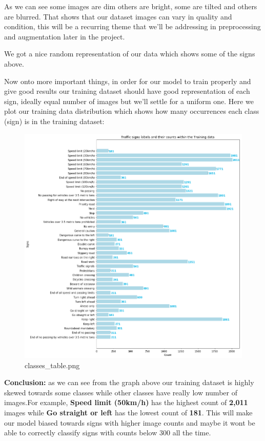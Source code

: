 \documentclass[11pt]{article}
\makeatletter
\def\maxwidth{\ifdim\Gin@nat@width>\linewidth\linewidth
    \else\Gin@nat@width\fi}
\let\Oldincludegraphics\includegraphics
\renewcommand{\includegraphics}[1]{\Oldincludegraphics[width=.8\maxwidth]{#1}}
\makeatother
\begin{document}
As we can see some images are dim others are bright, some are tilted and
others are blurred. That shows that our dataset images can vary in
quality and condition, this will be a recurring theme that we'll be
addressing in preprocessing and augmentation later in the project.

We got a nice random representation of our data which shows some of the
signs above.

Now onto more important things, in order for our model to train properly
and give good results our training dataset should have good
representation of each sign, ideally equal number of images but we'll
settle for a uniform one. Here we plot our training data distribution
which shows how many occurrences each class (sign) is in the training
dataset:

\begin{figure}
\centering
\includegraphics{./assets/classes_table.png}
\caption{classes\_table.png}
\end{figure}

\textbf{Conclusion:} as we can see from the graph above our training
dataset is highly skewed towards some classes while other classes have
really low number of images.For example, \textbf{Speed limit (50km/h)}
has the highest count of \textbf{2,011} images while \textbf{Go straight
or left} has the lowest count of \textbf{181}. This will make our model
biased towards signs with higher image counts and maybe it wont be able
to correctly classify signs with counts below 300 all the time.
\end{document}

